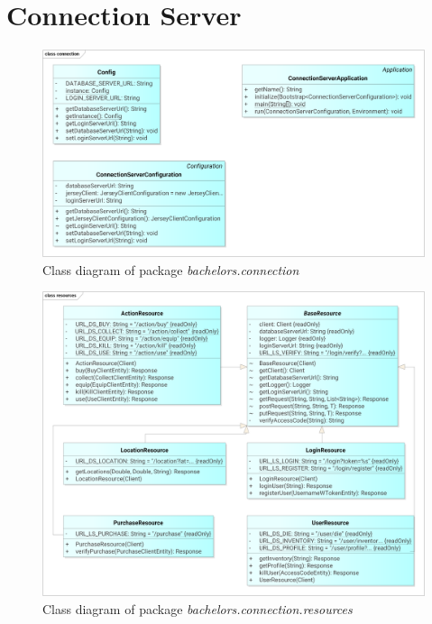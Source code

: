 \section{Connection Server}
\begin{figure}[h]	
	\includegraphics[width=\textwidth]{figures/classdiagrams/csconnection}
	\centering			
	\caption{Class diagram of package \textit{bachelors.connection}}
\end{figure}

\begin{figure}[h]	
	\includegraphics[width=\textwidth]{figures/classdiagrams/csresources}
	\centering			
	\caption{Class diagram of package \textit{bachelors.connection.resources}}
\end{figure}


